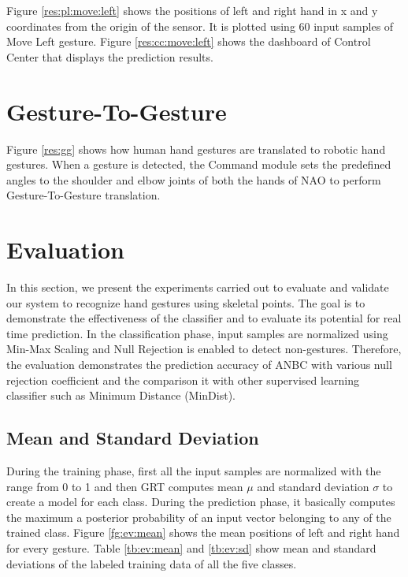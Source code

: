 

Figure \ref{res:pl:move:left} shows the positions of left and right hand in x and y coordinates from the origin of the sensor. It is plotted using 60 input samples of Move Left gesture. Figure \ref{res:cc:move:left} shows the dashboard of Control Center that displays the prediction results. 

\clearpage

\section{Gesture-To-Gesture} Figure \ref{res:gg} shows how human hand gestures are translated to robotic hand gestures. When a gesture is detected, the Command module sets the predefined angles to the shoulder and elbow joints of both the hands of NAO to perform Gesture-To-Gesture translation. 



\section{Evaluation} In this section, we present the experiments carried out to evaluate and validate our system to recognize hand gestures using skeletal points. The goal is to demonstrate the effectiveness of the classifier and to evaluate its potential for real time prediction. In the classification phase, input samples are normalized using Min-Max Scaling and Null Rejection is enabled to detect non-gestures. Therefore, the evaluation demonstrates the prediction accuracy of ANBC with various null rejection coefficient and the comparison it with other supervised learning classifier such as Minimum Distance (MinDist).



\subsection{Mean and Standard Deviation} During the training phase, first all the input samples are normalized with the range from 0 to 1 and then GRT computes mean $\mu$ and standard deviation $\sigma$ to create a model for each class. During the prediction phase, it basically computes the maximum a posterior probability of an input vector belonging to any of the trained class. Figure \ref{fg:ev:mean} shows the mean positions of left and right hand for every gesture. Table \ref{tb:ev:mean} and \ref{tb:ev:sd} show mean and standard deviations of the labeled training data of all the five classes. 

